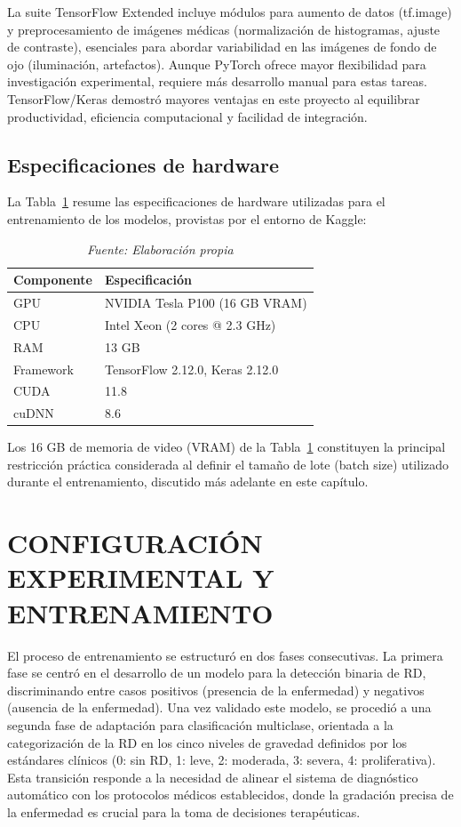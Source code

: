 La suite TensorFlow Extended incluye módulos para aumento de datos (tf.image) y 
preprocesamiento de imágenes médicas (normalización de histogramas, ajuste de contraste), 
esenciales para abordar variabilidad en las imágenes de fondo de ojo (iluminación, 
artefactos). Aunque PyTorch ofrece mayor flexibilidad para investigación experimental, 
requiere más desarrollo manual para estas tareas. TensorFlow/Keras
demostró mayores ventajas en este proyecto al equilibrar productividad, eficiencia 
computacional y facilidad de integración.

\subsection{Especificaciones de hardware}

La Tabla~\ref{tab:hardware-tiempos} resume las especificaciones de hardware utilizadas
para el entrenamiento de los modelos, provistas por el entorno de Kaggle:

\begin{table}[H]
\centering
\renewcommand{\arraystretch}{1.3}
\caption{Especificaciones de hardware}
\label{tab:hardware-tiempos}
\begin{tabularx}{\textwidth}{l X}
\hline
\textbf{Componente} & \textbf{Especificación} \\ \hline
GPU & NVIDIA Tesla P100 (16 GB VRAM) \\
CPU & Intel Xeon (2 cores @ 2.3 GHz) \\
RAM & 13 GB \\
Framework & TensorFlow 2.12.0, Keras 2.12.0 \\
CUDA & 11.8 \\
cuDNN & 8.6 \\ \hline
\end{tabularx}
\caption*{\textit{Fuente: Elaboración propia}}
\end{table}

Los 16 GB de memoria de video (VRAM) de la Tabla~\ref{tab:hardware-tiempos} constituyen
la principal restricción práctica considerada al definir el tamaño de lote (batch size)
utilizado durante el entrenamiento, discutido más adelante en este capítulo.

\section{CONFIGURACIÓN EXPERIMENTAL Y ENTRENAMIENTO} \label{sec:config-experimental}

El proceso de entrenamiento se estructuró en dos fases consecutivas. La primera fase se 
centró en el desarrollo de un modelo para la detección binaria de RD,
discriminando entre casos positivos (presencia de la enfermedad) y negativos 
(ausencia de la enfermedad). Una vez validado este modelo, se procedió a una segunda fase 
de adaptación para clasificación multiclase, orientada a la categorización de la RD en 
los cinco niveles de gravedad definidos por los estándares clínicos (0: sin RD, 1: leve, 
2: moderada, 3: severa, 4: proliferativa). Esta transición responde a la necesidad de 
alinear el sistema de diagnóstico automático con los protocolos médicos establecidos, 
donde la gradación precisa de la enfermedad es crucial para la toma de decisiones 
terapéuticas.

